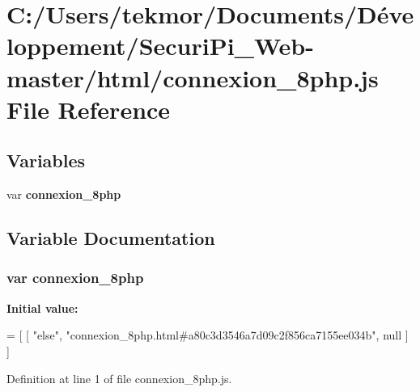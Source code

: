 \section{C\+:/\+Users/tekmor/\+Documents/\+Développement/\+Securi\+Pi\+\_\+\+Web-\/master/html/connexion\+\_\+8php.js File Reference}
\label{connexion__8php_8js}
\subsection*{Variables}
\begin{DoxyCompactItemize}
\item 
var {\bf connexion\+\_\+8php}
\end{DoxyCompactItemize}


\subsection{Variable Documentation}
\subsubsection[{connexion\+\_\+8php}]{\setlength{\rightskip}{0pt plus 5cm}var connexion\+\_\+8php}\label{connexion__8php_8js_a47f3af3e0a6a81ecbf6296e9763e32f5}
{\bfseries Initial value\+:}
\begin{DoxyCode}
=
[
    [ \textcolor{stringliteral}{"else"}, \textcolor{stringliteral}{"connexion\_8php.html#a80c3d3546a7d09c2f856ca7155ee034b"}, null ]
]
\end{DoxyCode}


Definition at line 1 of file connexion\+\_\+8php.\+js.

